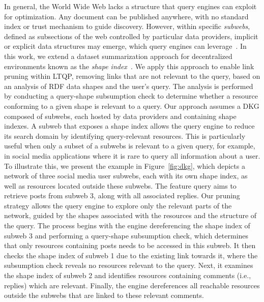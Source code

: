 In general, the World Wide Web lacks a structure that query engines can exploit for optimization.  
Any document can be published anywhere, with no standard index or trust mechanism to guide discovery.  
However, within specific \emph{subwebs}, defined as subsections of the web controlled by particular data providers, implicit or explicit data structures may emerge, which query engines can leverage~\cite{Bogaerts2021LinkTW}.
In this work, we extend a dataset summarization approach for decentralized environments known as the \emph{shape index}~\cite{tam2024opportunitiesshapebasedoptimizationlink}.
We apply this approach to enable link pruning within LTQP, removing links that are not relevant to the query, based on an analysis of RDF data shapes and the user's query.
The analysis is performed by conducting a query-shape subsumption check to determine whether a resource conforming to a given shape is relevant to a query.
Our approach assumes a DKG composed of subwebs, each hosted by data providers and containing shape indexes.
A subweb that exposes a shape index allows the query engine to reduce its search domain by identifying query-relevant resources.
This is particularly useful when only a subset of a subwebs is relevant to a given query, for example, in social media applications where it is rare to query all information about a user.
To illustrate this, we present the example in Figure~\ref{fig:dkg}, which depicts a network of three social media user subwebs, each with its own shape index, as well as resources located outside these subwebs.
The feature query aims to retrieve posts from subweb 3, along with all associated replies.
Our pruning strategy allows the query engine to explore only the relevant parts of the network, guided by the shapes associated with the resources and the structure of the query.
The process begins with the engine dereferencing the shape index of subweb 3 and performing a query-shape subsumption check, which determines that only resources containing posts needs to be accessed in this subweb.  
It then checks the shape index of subweb 1 due to the existing link towards it, where the subsumption check reveals no resources relevant to the query.  
Next, it examines the shape index of subweb 2 and identifies resources containing comments (i.e., replies) which are relevant.  
Finally, the engine dereferences all reachable resources outside the subwebs that are linked to these relevant comments.

